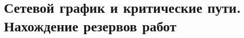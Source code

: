 \documentclass[discrete.tex]{subfiles}
\begin{document}
\section{Сетевой график и критические пути. Нахождение резервов работ}
\end{document}
